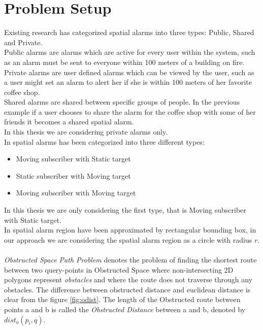 \section{Problem Setup}
Existing research has categorized spatial alarms into three types: Public, Shared and Private.\\
Public alarms are alarms which are active for every user within the system, such as an alarm must be sent to everyone within 100 meters of a building on fire. 
Private alarms are user defined alarms which can be viewed by the user, such as a user might set an alarm to alert her if she is within 100 meters of her favorite coffee shop.\\ 
Shared alarms are shared between specific groups of people. In the previous example if a user chooses to share the alarm for the coffee shop with some of her friends it becomes a shared spatial alarm.\\
In this thesis we are considering private alarms only. \\
In \cite{bamba}  spatial alarms has been categorized into three different types:
\begin{itemize}
 \item Moving subscriber with Static target
 \item Static subscriber with Moving target 
 \item Moving subscriber with Moving target 
\end{itemize}  
In this thesis we are only considering the first type, that is Moving subscriber with Static target.\\ 
In \cite{mur} spatial alarm region have been approximated by rectangular bounding box, in our approach we are considering the spatial alarm region as a circle with radius $r$.\\ \\
\textit{Obstructed Space Path Problem} \cite{deberg} denotes the problem of finding the shortest route between two query-points  in Obstructed Space where non-intersecting 2D polygons represent \textit{obstacles} and where the route does not traverse through any obstacles. The difference between obstructed distance and euclidean distance is clear from the figure \ref{fig:odist}. The length of the Obstructed route between points a and b is called the \textit{Obstructed Distance} between a and b, denoted by $dist_o(p_i,q)$.\\ \\

